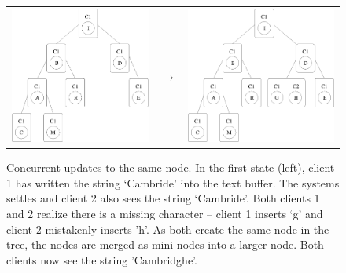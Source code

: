 \documentclass[12pt,a4paper,twoside,openright]{report}
\begin{document}
\begin{figure}[htb]
\centering
  \begin{tabular}{ >{\centering}m{6cm} >{\centering}m{15mm} >{\centering\arraybackslash}m{6cm} }
    \includegraphics[width=1\linewidth]{figs/treedoc_1.eps}  &
    $\longrightarrow$  &
    \includegraphics[width=1\linewidth]{figs/treedoc_2.eps}
  \end{tabular}
\caption{Concurrent updates to the same node. In the first state (left), client 1 has written the string `Cambride' into the text buffer. The systems settles and client 2 also sees the string `Cambride'. Both clients 1 and 2 realize there is a missing character -- client 1 inserts `g' and client 2 mistakenly inserts 'h'. As both create the same node in the tree, the nodes are merged as mini-nodes into a larger node. Both clients now see the string 'Cambridghe'.}
\label{fig:treedoc}
\end{figure}
\end{document}
